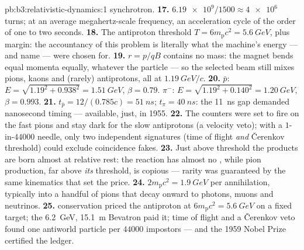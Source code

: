 \begin{solution}{pb:b3:relativistic-dynamics:1}
synchrotron.
\textbf{17.} $\num{6.19e9}/1500 \approx \num{4e6}$ turns; at an
average megahertz-scale frequency, an acceleration cycle of the order
of one to two seconds.
\textbf{18.} The antiproton threshold $T = 6m_{\text{p}}c^2 =
\qty{5.6}{GeV}$, plus margin: the accountancy of this problem is
literally what the machine's energy --- and name --- were chosen for.
\textbf{19.} $r = p/qB$ contains no mass: the magnet bends equal
momenta equally, whatever the particle --- so the selected beam still
mixes pions, kaons and (rarely) antiprotons, all at
$\qty{1.19}{GeV}/c$.
\textbf{20.} $\bar p$: $E = \sqrt{1.19^2 + 0.938^2} =
\qty{1.51}{GeV}$, $\beta = 0.79$. $\pi^-$: $E = \sqrt{1.19^2 +
0.140^2} = \qty{1.20}{GeV}$, $\beta = 0.993$.
\textbf{21.} $t_{\bar p} = 12/(0.785c) = \qty{51}{ns}$; $t_\pi =
\qty{40}{ns}$: the \qty{11}{ns} gap demanded nanosecond timing ---
available, just, in 1955.
\textbf{22.} The counters were set to fire on the fast pions and stay
dark for the slow antiprotons (a velocity veto); with a $1$-in-$44000$
needle, only two independent signatures (time of flight \emph{and}
\v Cerenkov threshold) could exclude coincidence fakes.
\textbf{23.} Just above threshold the products are born almost at
relative rest: the reaction has almost no , while pion
production, far above \emph{its} threshold, is copious --- rarity was
guaranteed by the same kinematics that set the price.
\textbf{24.} $2m_{\text{p}}c^2 = \qty{1.9}{GeV}$ per annihilation,
typically into a handful of pions that decay onward to photons, muons
and neutrinos.
\textbf{25.}  conservation priced the antiproton at
$6m_{\text{p}}c^2 = \qty{5.6}{GeV}$ on a fixed target; the
\qty{6.2}{GeV}, \qty{15.1}{m} Bevatron paid it; time of flight and a
\v Cerenkov veto found one antiworld particle per $44000$ impostors
--- and the 1959 Nobel Prize certified the ledger.
\end{solution}
